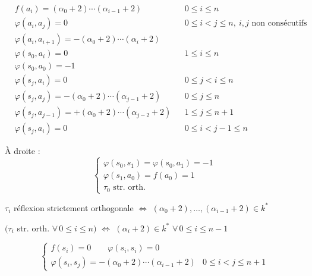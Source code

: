 \documentclass[11pt,a4paper]{article}
\begin{document}
\[
\begin{aligned}
& f(a_i) = (\alpha_0 + 2) \cdots (\alpha_{i-1} + 2) && 0 \leqslant i \leqslant n \\
& \varphi(a_i, a_j) = 0 && 0 \leqslant i < j \leqslant n,\ i, j \text{ non consécutifs} \\
& \varphi(a_i, a_{i+1}) = -(\alpha_0 + 2) \cdots (\alpha_i + 2) \\
& \varphi(s_0, a_i) = 0 && 1 \leqslant i \leqslant n \\
& \varphi(s_0, a_0) = -1 \\
& \varphi(s_j, a_i) = 0 && 0 \leqslant j < i \leqslant n \\
& \varphi(s_j, a_j) = -(\alpha_0 + 2) \cdots (\alpha_{j-1} + 2) && 0 \leqslant j \leqslant n \\
& \varphi(s_j, a_{j-1}) = +(\alpha_0 + 2) \cdots (\alpha_{j-2} + 2) && 1 \leqslant j \leqslant n+1 \\
& \varphi(s_j, a_i) = 0 && 0 \leqslant i < j-1 \leqslant n
\end{aligned}
\]

À droite :
\[
\begin{cases}
\varphi(s_0, s_1) = \varphi(s_0, a_1) = -1 \\
\varphi(s_1, a_0) = f(a_0) = 1 \\
\tau_0 \text{ str. orth.}
\end{cases}
\]

$\tau_i$ réflexion strictement orthogonale $\Longleftrightarrow$
$(\alpha_0 + 2), \ldots, (\alpha_{i-1} + 2) \in k^{*}$

$(\tau_i$ str. orth. $\forall\, 0 \leqslant i \leqslant n)$ $\Longleftrightarrow$
$(\alpha_i + 2) \in k^{*}$ $\forall\, 0 \leqslant i \leqslant n-1$

\[
\begin{cases}
f(s_i) = 0 \qquad \varphi(s_i, s_i) = 0 \\
\varphi(s_i, s_j) = -(\alpha_0 + 2) \cdots (\alpha_{i-1} + 2) & 0 \leqslant i < j \leqslant n+1
\end{cases}
\]
\end{document}
